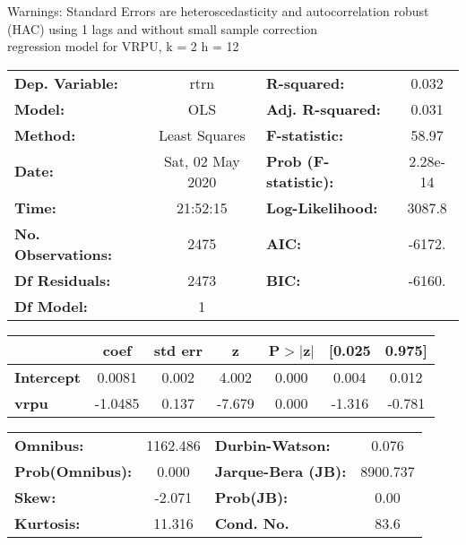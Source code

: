 Warnings: \newline
 [1] Standard Errors are heteroscedasticity and autocorrelation robust (HAC) using 1 lags and without small sample correction\\ 

regression model for VRPU, k = 2 h = 12\begin{center}
\begin{tabular}{lclc}
\toprule
\textbf{Dep. Variable:}    &       rtrn       & \textbf{  R-squared:         } &     0.032   \\
\textbf{Model:}            &       OLS        & \textbf{  Adj. R-squared:    } &     0.031   \\
\textbf{Method:}           &  Least Squares   & \textbf{  F-statistic:       } &     58.97   \\
\textbf{Date:}             & Sat, 02 May 2020 & \textbf{  Prob (F-statistic):} &  2.28e-14   \\
\textbf{Time:}             &     21:52:15     & \textbf{  Log-Likelihood:    } &    3087.8   \\
\textbf{No. Observations:} &        2475      & \textbf{  AIC:               } &    -6172.   \\
\textbf{Df Residuals:}     &        2473      & \textbf{  BIC:               } &    -6160.   \\
\textbf{Df Model:}         &           1      & \textbf{                     } &             \\
\bottomrule
\end{tabular}
\begin{tabular}{lcccccc}
                   & \textbf{coef} & \textbf{std err} & \textbf{z} & \textbf{P$> |$z$|$} & \textbf{[0.025} & \textbf{0.975]}  \\
\midrule
\textbf{Intercept} &       0.0081  &        0.002     &     4.002  &         0.000        &        0.004    &        0.012     \\
\textbf{vrpu}      &      -1.0485  &        0.137     &    -7.679  &         0.000        &       -1.316    &       -0.781     \\
\bottomrule
\end{tabular}
\begin{tabular}{lclc}
\textbf{Omnibus:}       & 1162.486 & \textbf{  Durbin-Watson:     } &    0.076  \\
\textbf{Prob(Omnibus):} &   0.000  & \textbf{  Jarque-Bera (JB):  } & 8900.737  \\
\textbf{Skew:}          &  -2.071  & \textbf{  Prob(JB):          } &     0.00  \\
\textbf{Kurtosis:}      &  11.316  & \textbf{  Cond. No.          } &     83.6  \\
\bottomrule
\end{tabular}
\end{center}

